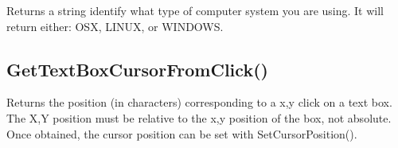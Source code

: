 \documentclass[letterpaper,10pt,english]{sphinxmanual}
\begin{document}
\sphinxAtStartPar
{}

\sphinxAtStartPar
Returns a string identify what type of computer system you are using. It will return either: OSX, LINUX, or WINDOWS.

\sphinxAtStartPar
{}

\begin{sphinxVerbatim}[commandchars=\\\{\}]
\end{sphinxVerbatim}

\sphinxAtStartPar
{}

\begin{sphinxVerbatim}[commandchars=\\\{\}]
\end{sphinxVerbatim}

\sphinxAtStartPar
{}

\sphinxAtStartPar
{}

\ignorespaces 

\subsection{GetTextBoxCursorFromClick()}
\label{\detokenize{reference/peblenvironment:gettextboxcursorfromclick}}\label{\detokenize{reference/peblenvironment:index-25}}
\sphinxAtStartPar
{}

\sphinxAtStartPar
Returns the position (in characters) corresponding to a x,y click on a text box.  The X,Y position must be relative to the x,y position of the box, not absolute.  Once obtained, the cursor position can be set with SetCursorPosition().

\sphinxAtStartPar
{}

\begin{sphinxVerbatim}[commandchars=\\\{\}]
\end{sphinxVerbatim}
\end{document}

